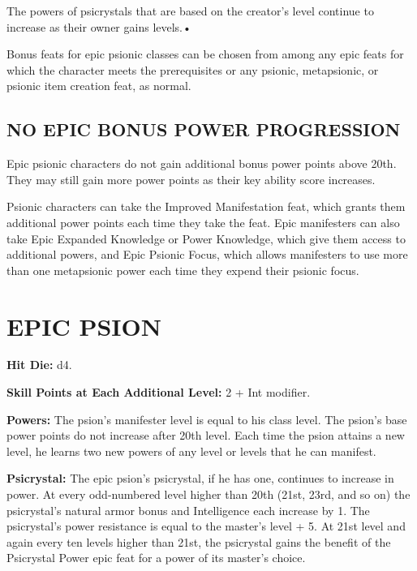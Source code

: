 \documentclass{article}
\begin{document}
The powers of psicrystals that are based on the creator's level continue to increase 
as their owner gains levels.• 

\parindent=7pt
Bonus feats for epic psionic classes can be chosen from among any epic feats for 
which the character meets the prerequisites or any psionic, metapsionic, or psionic 
item creation feat, as normal.

\vspace{12pt}
\subsection*{NO EPIC BONUS POWER PROGRESSION}

\parindent=0pt
Epic psionic characters do not gain additional bonus power points above 20th. They 
may still gain more power points as their key ability score increases.

Psionic characters can take the Improved Manifestation feat, which grants them 
additional power points each time they take the feat. Epic manifesters can also 
take Epic Expanded Knowledge or Power Knowledge, which give them access to additional 
powers, and Epic Psionic Focus, which allows manifesters to use more than one metapsionic 
power each time they expend their psionic focus.

\vspace{12pt}
\section*{{\LARGE{}EPIC PSION}}

\textbf{Hit Die:} d4.

\textbf{Skill Points at Each Additional Level:} 2 + Int modifier.

\textbf{Powers: }The psion's manifester level is equal to his class level. The 
psion's base power points do not increase after 20th level. Each time the psion 
attains a new level, he learns two new powers of any level or levels that he can 
manifest.

\textbf{Psicrystal:} The epic psion's psicrystal, if he has one, continues to increase 
in power. At every odd-numbered level higher than 20th (21st, 23rd, and so on) 
the psicrystal's natural armor bonus and Intelligence each increase by 1. The psicrystal's 
power resistance is equal to the master's level + 5. At 21st level and again every 
ten levels higher than 21st, the psicrystal gains the benefit of the Psicrystal 
Power epic feat for a power of its master's choice.
\end{document}
